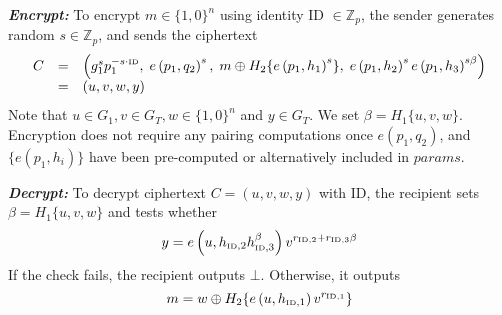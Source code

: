 \begin{algorithm}
\begin{description}
\item \textbf{\textit{Encrypt:}} To encrypt $m \in \{ 1, 0 \}^n$ using identity ID $\in \mathbb{Z}_p$, the sender generates random $s \in \mathbb{Z}_p$, and sends the ciphertext
\begin{equation*}
 \begin{array}{lcl}
  C & = & \left( g_{1}^{s}p_1^{-s\cdot\textrm{\tiny{ID}}}, \; e \left( p_1, q_2\right)^s, \; m \oplus H_2 \{ e \left( p_1, h_1 \right)^s \}, \; e \left( p_1, h_2 \right)^s e \left( p_1, h_3\right)^{s \beta} \right) \\ & = & \left( u, v, w, y \right)
 \end{array}
\end{equation*}
Note that $u \in G_1, v \in G_T,  w \in \{ 1, 0 \}^n$ and $y \in G_T$. We set $\beta = H_1 \{ u, v, w \}$. Encryption does not require any pairing computations once $e \left( p_1, q_2 \right)$, and $\{ e \left( p_1, h_i \right) \}$ have been pre-computed or alternatively included in $params$.

\item \textbf{\textit{Decrypt:}} To decrypt ciphertext $C = \left( u, v, w, y \right)$ with ID, the recipient sets $\beta=H_1 \{ u, v, w \}$ and tests whether
\begin{equation*}
 y = e \left( u, h_{\textrm{\tiny{ID}}, 2}h_{\textrm{\tiny{ID}}, 3}^{\beta} \right)v^{r_{\textrm{\tiny{ID}},2}+r_{\textrm{\tiny{ID}},3}\beta}
\end{equation*}
If the check fails, the recipient outputs $\bot$. Otherwise, it outputs
\begin{equation*}
 m = w \oplus H_2 \{ e \left( u, h_{\textrm{\tiny{ID}}, 1} \right) v^{r_{\textrm{\tiny{ID}}, 1}} \}
\end{equation*}

\end{description}
\end{algorithm}

